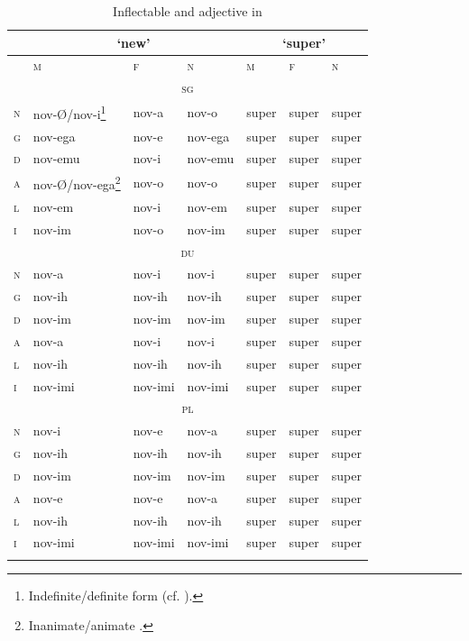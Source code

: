 \documentclass[output=paper,colorlinks,citecolor=brown]{langscibook}
\begin{document}
\begin{table}[ht]
	\centering
	\begin{tabularx}{0.9\textwidth}{p{0.5cm}p{2.6cm}p{1.5cm}p{1.5cm}XXX}
		\lsptoprule
        & \multicolumn{3}{c}{`new'} & \multicolumn{3}{c}{`super'} \\
        \midrule
		& \textsc{m} & \textsc{f} & \textsc{n} & \textsc{m} & \textsc{f} & \textsc{n} \\
		\midrule
		\multicolumn{7}{c}{\textsc{sg}} \\
		\midrule
		\textsc{n} & nov-Ø/nov-i\footnote{Indefinite/definite form (cf. \citealt[36]{greenberg2008}).} & nov-a & nov-o & super & super & super \\
		\textsc{g} & nov-ega & nov-e & nov-ega & super & super & super \\
		\textsc{d} & nov-emu & nov-i & nov-emu & super & super & super \\
		\textsc{a} & nov-Ø/nov-ega\footnote{Inanimate/animate\is{animacy} \isi{gender}.} & nov-o & nov-o & super & super & super \\
		\textsc{l} & nov-em & nov-i & nov-em & super & super & super \\
		\textsc{i} & nov-im & nov-o & nov-im & super & super & super \\
		\midrule
		\multicolumn{7}{c}{\textsc{du}} \\
		\midrule
		\textsc{n} & nov-a & nov-i & nov-i & super & super & super \\
		\textsc{g} & nov-ih & nov-ih & nov-ih & super & super & super \\
		\textsc{d} & nov-im & nov-im & nov-im & super & super & super \\
		\textsc{a} & nov-a & nov-i & nov-i & super & super & super \\
		\textsc{l} & nov-ih & nov-ih & nov-ih & super & super & super \\
		\textsc{i} & nov-imi & nov-imi & nov-imi & super & super & super \\
		\midrule
		\multicolumn{7}{c}{\textsc{pl}} \\
		\midrule
		\textsc{n} & nov-i & nov-e & nov-a & super & super & super \\
		\textsc{g} & nov-ih & nov-ih & nov-ih & super & super & super \\
		\textsc{d} & nov-im & nov-im & nov-im & super & super & super \\
		\textsc{a} & nov-e & nov-e & nov-a & super & super & super \\
		\textsc{l} & nov-ih & nov-ih & nov-ih & super & super & super \\
		\textsc{i} & nov-imi & nov-imi & nov-imi & super & super & super \\
		\lspbottomrule
	\end{tabularx}
	\caption{Inflectable and  adjective in }
	\label{03tab4}
\end{table}
\end{document}
